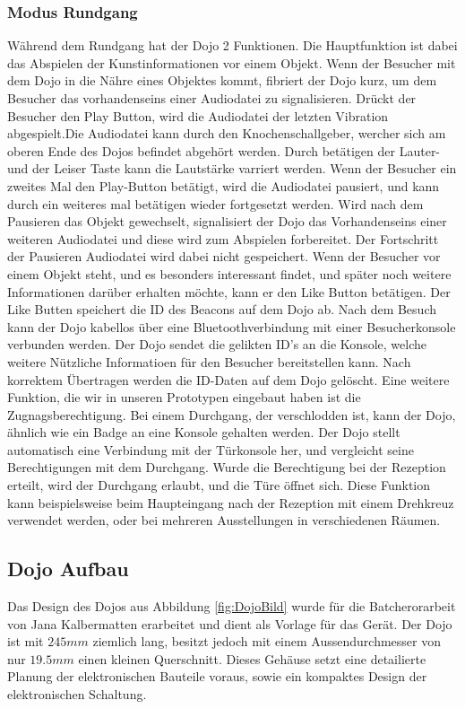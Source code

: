 \subsubsection{Modus Rundgang}
Während dem Rundgang hat der Dojo 2 Funktionen. Die Hauptfunktion ist dabei das Abspielen der Kunstinformationen vor einem Objekt. Wenn der Besucher mit dem Dojo in die Nähre eines Objektes kommt, fibriert der Dojo kurz, um dem Besucher das vorhandenseins einer Audiodatei zu signalisieren. Drückt der Besucher den Play Button, wird die Audiodatei der letzten Vibration abgespielt.Die Audiodatei kann durch den Knochenschallgeber, wercher sich am oberen Ende des Dojos befindet abgehört werden. Durch betätigen der Lauter-und der Leiser Taste kann die Lautstärke varriert werden. Wenn der Besucher ein zweites Mal den Play-Button betätigt, wird die Audiodatei pausiert, und kann durch ein weiteres mal betätigen wieder fortgesetzt werden. Wird nach dem Pausieren das Objekt gewechselt, signalisiert der Dojo das Vorhandenseins einer weiteren Audiodatei und diese wird zum Abspielen forbereitet. Der Fortschritt der Pausieren Audiodatei wird dabei nicht gespeichert. Wenn der Besucher vor einem Objekt steht, und es besonders interessant findet, und später noch weitere Informationen darüber erhalten möchte, kann er den Like Button betätigen. Der Like Butten speichert die ID des Beacons auf dem Dojo ab. Nach dem Besuch kann der Dojo kabellos über eine Bluetoothverbindung mit einer Besucherkonsole verbunden werden. Der Dojo sendet die gelikten ID's an die Konsole, welche weitere Nützliche Informatioen für den Besucher bereitstellen kann. Nach korrektem Übertragen werden die ID-Daten auf dem Dojo gelöscht.
Eine weitere Funktion, die wir in unseren Prototypen eingebaut haben ist die Zugnagsberechtigung. Bei einem Durchgang, der verschlodden ist, kann der Dojo, ähnlich wie ein Badge an eine Konsole gehalten werden. Der Dojo stellt automatisch eine Verbindung mit der Türkonsole her, und vergleicht seine Berechtigungen mit dem Durchgang. Wurde die Berechtigung bei der Rezeption erteilt, wird der Durchgang erlaubt, und die Türe öffnet sich. Diese Funktion kann beispielsweise beim Haupteingang nach der Rezeption mit einem Drehkreuz verwendet werden, oder bei mehreren Ausstellungen in verschiedenen Räumen.
\clearpage
\subsection{Dojo Aufbau}
Das Design des Dojos aus Abbildung \ref{fig:DojoBild} wurde für die Batcherorarbeit von Jana Kalbermatten erarbeitet und dient als Vorlage für das Gerät. Der Dojo ist mit $245mm$ ziemlich lang, besitzt jedoch mit einem Aussendurchmesser von nur $19.5mm$ einen kleinen Querschnitt. Dieses Gehäuse setzt eine detailierte Planung der elektronischen Bauteile voraus, sowie ein kompaktes Design der elektronischen Schaltung.


